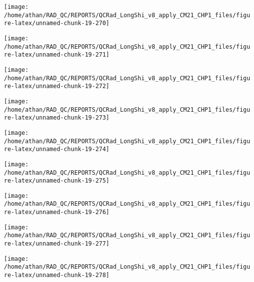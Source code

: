 \documentclass[
  10pt,
  a4paper,oneside]{article}
\begin{document}
\begin{center}\texttt{[image: /home/athan/RAD\_QC/REPORTS/QCRad\_LongShi\_v8\_apply\_CM21\_CHP1\_files/figure-latex/unnamed-chunk-19-270]} \end{center}

\begin{center}\texttt{[image: /home/athan/RAD\_QC/REPORTS/QCRad\_LongShi\_v8\_apply\_CM21\_CHP1\_files/figure-latex/unnamed-chunk-19-271]} \end{center}

\begin{center}\texttt{[image: /home/athan/RAD\_QC/REPORTS/QCRad\_LongShi\_v8\_apply\_CM21\_CHP1\_files/figure-latex/unnamed-chunk-19-272]} \end{center}

\begin{center}\texttt{[image: /home/athan/RAD\_QC/REPORTS/QCRad\_LongShi\_v8\_apply\_CM21\_CHP1\_files/figure-latex/unnamed-chunk-19-273]} \end{center}

\begin{center}\texttt{[image: /home/athan/RAD\_QC/REPORTS/QCRad\_LongShi\_v8\_apply\_CM21\_CHP1\_files/figure-latex/unnamed-chunk-19-274]} \end{center}

\begin{center}\texttt{[image: /home/athan/RAD\_QC/REPORTS/QCRad\_LongShi\_v8\_apply\_CM21\_CHP1\_files/figure-latex/unnamed-chunk-19-275]} \end{center}

\begin{center}\texttt{[image: /home/athan/RAD\_QC/REPORTS/QCRad\_LongShi\_v8\_apply\_CM21\_CHP1\_files/figure-latex/unnamed-chunk-19-276]} \end{center}

\begin{center}\texttt{[image: /home/athan/RAD\_QC/REPORTS/QCRad\_LongShi\_v8\_apply\_CM21\_CHP1\_files/figure-latex/unnamed-chunk-19-277]} \end{center}

\begin{center}\texttt{[image: /home/athan/RAD\_QC/REPORTS/QCRad\_LongShi\_v8\_apply\_CM21\_CHP1\_files/figure-latex/unnamed-chunk-19-278]} \end{center}
\end{document}
